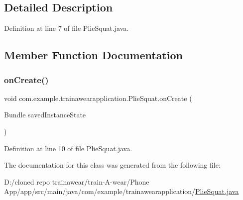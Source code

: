 \subsection{Detailed Description}


Definition at line 7 of file Plie\+Squat.\+java.



\subsection{Member Function Documentation}
\mbox{\label{classcom_1_1example_1_1trainawearapplication_1_1_plie_squat_a3125f76f7d64ff641f8f07e2b8d5c3a7}} 
\subsubsection{\texorpdfstring{onCreate()}{onCreate()}}
{\footnotesize\ttfamily void com.\+example.\+trainawearapplication.\+Plie\+Squat.\+on\+Create (\begin{DoxyParamCaption}\item[{Bundle}]{saved\+Instance\+State }\end{DoxyParamCaption})\hspace{0.3cm}{\ttfamily [protected]}}



Definition at line 10 of file Plie\+Squat.\+java.


\begin{DoxyCode}{0}

\end{DoxyCode}


The documentation for this class was generated from the following file\+:\begin{DoxyCompactItemize}
\item 
D\+:/cloned repo trainawear/train-\/\+A-\/wear/\+Phone App/app/src/main/java/com/example/trainawearapplication/\mbox{\hyperlink{_plie_squat_8java}{Plie\+Squat.\+java}}\end{DoxyCompactItemize}
